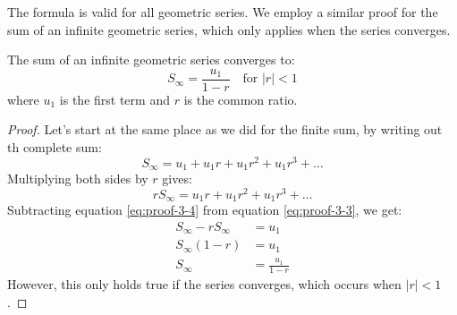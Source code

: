 The formula is valid for all geometric series. We employ a similar proof for the sum 
of an infinite geometric series, which only applies when the series converges.

\begin{proposition}
	The sum of an infinite geometric series converges to:
	\begin{equation}
		S_\infty = \frac{u_1}{1 - r} \quad \text{for } |r| < 1
	\end{equation}
	where $u_1$ is the first term and $r$ is the common ratio.
\end{proposition}
\begin{proof}
	Let's start at the same place as we did for the finite sum, by writing out th complete sum:
	\begin{equation}\label{eq:proof-3-3}
		S_\infty = u_1 + u_1 r + u_1 r^2 + u_1 r^3 + \ldots
	\end{equation}
	Multiplying both sides by $r$ gives:
	\begin{equation}\label{eq:proof-3-4}
		r S_\infty = u_1 r + u_1 r^2 + u_1 r^3 + \ldots
	\end{equation}
	Subtracting equation \eqref{eq:proof-3-4} from equation \eqref{eq:proof-3-3}, we get:
	\begin{align*}
		S_\infty - r S_\infty &= u_1 \\
		S_\infty (1 - r) &= u_1 \\
		S_\infty &= \frac{u_1}{1 - r}
	\end{align*}
	However, this only holds true if the series converges, which occurs when $|r| < 1$.
\end{proof}